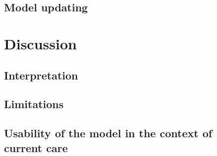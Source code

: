 \documentclass{article}
\begin{document}

\subsection{Model updating}\label{sec:model_updating}

\section{Discussion}\label{sec:discussion}

\subsection{Interpretation}\label{sec:interpretation}

\subsection{Limitations}\label{sec:limitations}

\subsection{Usability of the model in the context of current care}\label{sec:usability}


\end{document}
